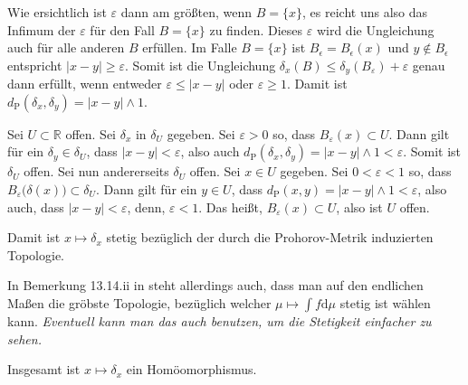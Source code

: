 \documentclass{article}
\begin{document}
Wie ersichtlich ist $\varepsilon$ dann am größten, wenn $B=\{x\}$, es reicht uns also das Infimum der $\varepsilon$ für den Fall $B=\{x\}$ zu finden.
Dieses $\varepsilon$ wird die Ungleichung auch für alle anderen $B$ erfüllen.
Im Falle $B=\{x\}$ ist $B_\epsilon=B_\epsilon(x)$ und $y\notin B_\epsilon$ entspricht $|x-y|\geq\varepsilon$.
Somit ist die Ungleichung $\delta_x(B)\leq\delta_y(B_\varepsilon)+\varepsilon$ genau dann erfüllt, wenn entweder $\varepsilon\leq|x-y|$ oder $\varepsilon\geq1$.
Damit ist $d_\mathrm{P}(\delta_x,\delta_y)=|x-y|\wedge1$.

Sei $U\subset\mathbb{R}$ offen.
Sei $\delta_x$ in $\delta_U$ gegeben.
Sei $\varepsilon>0$ so, dass $B_\varepsilon(x)\subset U$.
Dann gilt für ein $\delta_y\in \delta_U$, dass $|x-y|<\varepsilon$, also auch $d_\mathrm{P}(\delta_x,\delta_y)=|x-y|\wedge1<\varepsilon$.
Somit ist $\delta_U$ offen.
Sei nun andererseits $\delta_U$ offen.
Sei $x\in U$ gegeben.
Sei $0<\varepsilon<1$ so, dass $B_\varepsilon\bigl(\delta(x)\bigr)\subset \delta_U$.
Dann gilt für ein $y\in U$, dass $d_\mathrm{P}(x,y)=|x-y|\wedge1<\varepsilon$, also auch, dass $|x-y|<\varepsilon$, denn, $\varepsilon<1$.
Das heißt, $B_\varepsilon(x)\subset U$, also ist $U$ offen.

Damit ist $x\mapsto\delta_x$ stetig bezüglich der durch die Prohorov-Metrik induzierten Topologie.

In Bemerkung 13.14.ii in \cite{klenke} steht allerdings auch, dass man auf den endlichen Maßen die gröbste Topologie, bezüglich welcher $\mu\mapsto\int f\mathrm{d}\mu$ stetig ist wählen kann.
\emph{Eventuell kann man das auch benutzen, um die Stetigkeit einfacher zu sehen.}

Insgesamt ist $x\mapsto \delta_x$ ein Homöomorphismus.

\end{document}

